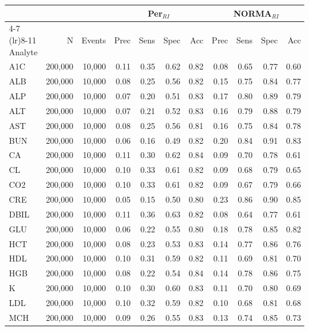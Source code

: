 \begin{table}[ht]
\centering
\footnotesize
\begin{tabular}{lrrrrrrrrrr}
\toprule
 & &  & \multicolumn{4}{c}{Per$_{RI}$} & \multicolumn{4}{c}{NORMA$_{RI}$} \\
\cmidrule(lr){4-7} \cmidrule(lr){8-11}
Analyte & N & Events & Prec & Sens & Spec & Acc & Prec & Sens & Spec & Acc \\
\midrule
A1C & 200,000 & 10,000 & 0.11 & 0.35 & 0.62 & 0.82 & 0.08 & 0.65 & 0.77 & 0.60 \\
ALB & 200,000 & 10,000 & 0.08 & 0.25 & 0.56 & 0.82 & 0.15 & 0.75 & 0.84 & 0.77 \\
ALP & 200,000 & 10,000 & 0.07 & 0.20 & 0.51 & 0.83 & 0.17 & 0.80 & 0.89 & 0.79 \\
ALT & 200,000 & 10,000 & 0.07 & 0.21 & 0.52 & 0.83 & 0.16 & 0.79 & 0.88 & 0.79 \\
AST & 200,000 & 10,000 & 0.08 & 0.25 & 0.56 & 0.81 & 0.16 & 0.75 & 0.84 & 0.78 \\
BUN & 200,000 & 10,000 & 0.06 & 0.16 & 0.49 & 0.82 & 0.20 & 0.84 & 0.91 & 0.83 \\
CA & 200,000 & 10,000 & 0.11 & 0.30 & 0.62 & 0.84 & 0.09 & 0.70 & 0.78 & 0.61 \\
CL & 200,000 & 10,000 & 0.10 & 0.33 & 0.61 & 0.82 & 0.09 & 0.68 & 0.79 & 0.65 \\
CO2 & 200,000 & 10,000 & 0.10 & 0.33 & 0.61 & 0.82 & 0.09 & 0.67 & 0.79 & 0.66 \\
CRE & 200,000 & 10,000 & 0.05 & 0.15 & 0.50 & 0.80 & 0.23 & 0.86 & 0.90 & 0.85 \\
DBIL & 200,000 & 10,000 & 0.11 & 0.36 & 0.63 & 0.82 & 0.08 & 0.64 & 0.77 & 0.61 \\
GLU & 200,000 & 10,000 & 0.06 & 0.22 & 0.55 & 0.80 & 0.18 & 0.78 & 0.85 & 0.82 \\
HCT & 200,000 & 10,000 & 0.08 & 0.23 & 0.53 & 0.83 & 0.14 & 0.77 & 0.86 & 0.76 \\
HDL & 200,000 & 10,000 & 0.10 & 0.31 & 0.59 & 0.82 & 0.11 & 0.69 & 0.81 & 0.70 \\
HGB & 200,000 & 10,000 & 0.08 & 0.22 & 0.54 & 0.84 & 0.14 & 0.78 & 0.86 & 0.75 \\
K & 200,000 & 10,000 & 0.10 & 0.30 & 0.60 & 0.83 & 0.11 & 0.70 & 0.80 & 0.69 \\
LDL & 200,000 & 10,000 & 0.10 & 0.32 & 0.59 & 0.82 & 0.10 & 0.68 & 0.81 & 0.68 \\
MCH & 200,000 & 10,000 & 0.09 & 0.26 & 0.55 & 0.83 & 0.13 & 0.74 & 0.85 & 0.73 \\

\end{tabular}
\end{table}
